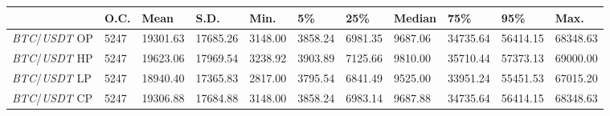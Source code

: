 \begin{tabular}{lllllllllll}
\toprule
 & \textbf{O.C.} & \textbf{Mean} & \textbf{S.D.} & \textbf{Min.} & \textbf{5\%} & \textbf{25\%} & \textbf{Median} & \textbf{75\%} & \textbf{95\%} & \textbf{Max.} \\
\midrule
\emph{BTC}/\emph{USDT} OP & 5247 & 19301.63 & 17685.26 & 3148.00 & 3858.24 & 6981.35 & 9687.06 & 34735.64 & 56414.15 & 68348.63 \\
\emph{BTC}/\emph{USDT} HP & 5247 & 19623.06 & 17969.54 & 3238.92 & 3903.89 & 7125.66 & 9810.00 & 35710.44 & 57373.13 & 69000.00 \\
\emph{BTC}/\emph{USDT} LP & 5247 & 18940.40 & 17365.83 & 2817.00 & 3795.54 & 6841.49 & 9525.00 & 33951.24 & 55451.53 & 67015.20 \\
\emph{BTC}/\emph{USDT} CP & 5247 & 19306.88 & 17684.88 & 3148.00 & 3858.24 & 6983.14 & 9687.88 & 34735.64 & 56414.15 & 68348.63 \\
\bottomrule
\end{tabular}
